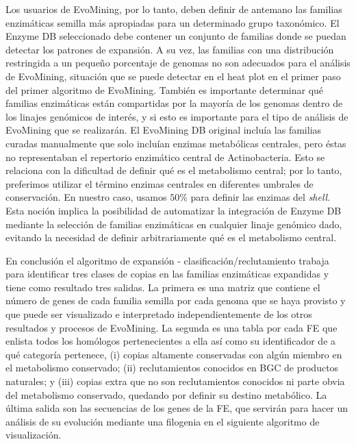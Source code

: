 \documentclass[12pt,twoside]{reedthesis}
\begin{document}
  Los usuarios de EvoMining, por lo tanto, deben definir de antemano las
  familias enzimáticas semilla más apropiadas para un determinado grupo
  taxonómico. El Enzyme DB seleccionado debe contener un conjunto de
  familias donde se puedan detectar los patrones de expansión. A su vez,
  las familias con una distribución restringida a un pequeño porcentaje de
  genomas no son adecuados para el análisis de EvoMining, situación que se
  puede detectar en el heat plot en el primer paso del primer algoritmo de
  EvoMining. También es importante determinar qué familias enzimáticas
  están compartidas por la mayoría de los genomas dentro de los linajes
  genómicos de interés, y si esto es importante para el tipo de análisis
  de EvoMining que se realizarán. El EvoMining DB original incluía las
  familias curadas manualmente que solo incluían enzimas metabólicas
  centrales, pero éstas no representaban el repertorio enzimático central
  de Actinobacteria. Esto se relaciona con la dificultad de definir qué es
  el metabolismo central; por lo tanto, preferimos utilizar el término
  enzimas centrales en diferentes umbrales de conservación. En nuestro
  caso, usamos \(50\%\) para definir las enzimas del \emph{shell}. Esta
  noción implica la posibilidad de automatizar la integración de Enzyme DB
  mediante la selección de familias enzimáticas en cualquier linaje
  genómico dado, evitando la necesidad de definir arbitrariamente qué es
  el metabolismo central.
  
  En conclusión el algoritmo de expansión - clasificación/reclutamiento
  trabaja para identificar tres clases de copias en las familias
  enzimáticas expandidas y tiene como resultado tres salidas. La primera
  es una matriz que contiene el número de genes de cada familia semilla
  por cada genoma que se haya provisto y que puede ser visualizado e
  interpretado independientemente de los otros resultados y procesos de
  EvoMining. La segunda es una tabla por cada FE que enlista todos los
  homólogos pertenecientes a ella así como su identificador de a qué
  categoría pertenece, (i) copias altamente conservadas con algún miembro
  en el metabolismo conservado; (ii) reclutamientos conocidos en BGC de
  productos naturales; y (iii) copias extra que no son reclutamientos
  conocidos ni parte obvia del metabolismo conservado, quedando por
  definir su destino metabólico. La última salida son las secuencias de
  los genes de la FE, que servirán para hacer un análisis de su evolución
  mediante una filogenia en el siguiente algoritmo de visualización.
  
\end{document}
